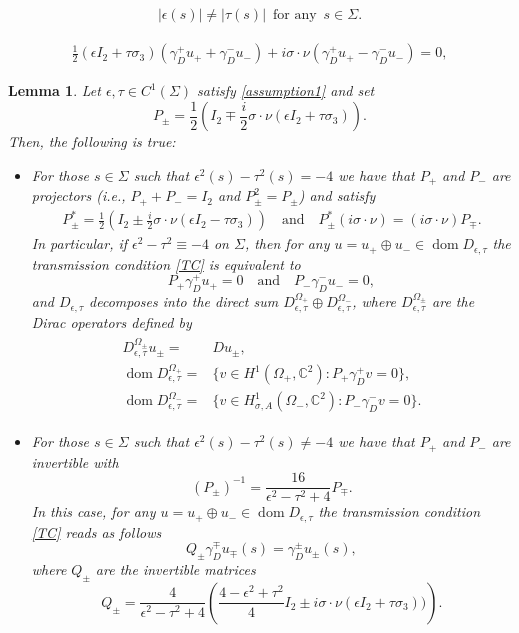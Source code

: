 \documentclass[10pt,a4paper]{amsart}
\newtheorem{lemma}{Lemma}
\def \cc {{\mathbb C}}
\DeclareMathOperator{\dom}{dom}
\begin{document}
     \begin{align}\label{assumption1}
     |\epsilon(s)|\neq |\tau(s)|\,\,\, \text{for any }\, s\in\Sigma.
     \end{align}

\begin{align}\label{TC}
    \frac{1}{2}(\epsilon I_2+\tau\sigma_3)(\gamma_D^+u_+ +\gamma_D^-u_-) +i\sigma\cdot\nu(\gamma_D^+u_+-\gamma_D^-u_-)=0,
 \end{align}

\begin{lemma}\label{TC_alter} Let $\epsilon,\tau\in C^1(\Sigma)$ satisfy \eqref{assumption1} and set 
\begin{equation*}\label{Projection}
    P_\pm=\frac{1}{2}\left(I_2 \mp \frac{i}{2}\sigma\cdot\nu(\epsilon I_2+\tau\sigma_3) \right).
\end{equation*}
Then, the following is true:  
\begin{itemize}
    \item[(i)] For those $s\in\Sigma$ such that   $\epsilon^2(s)-\tau^2(s)=-4$ we have that  $P_+$ and $P_-$ are projectors (i.e., $P_+ +P_-=I_2$ and $P_\pm^2= P_\pm$) and satisfy 
    \begin{align}\label{P_pm}
   P_\pm^\ast=\frac{1}{2}\left(I_2 \pm \frac{i}{2}\sigma\cdot\nu(\epsilon I_2-\tau\sigma_3) \right)\quad\text{and}\quad   P_\pm^\ast(i\sigma\cdot\nu)=(i\sigma\cdot\nu)P_\mp.
    \end{align}
  In particular, if  $\epsilon^2-\tau^2\equiv-4$ on $\Sigma$, then  for any $u=u_+\oplus u_-\in\dom D_{\epsilon,\tau}$ the transmission condition \eqref{TC} is equivalent to
    \[
    P_+ \gamma_D^+u_+=0 \quad\text{and}\quad  P_- \gamma_D^-u_-=0,
    \]
  and $D_{\epsilon,\tau}$ decomposes into the direct sum $D^{\Omega_+}_{\epsilon,\tau}\oplus D^{\Omega_-}_{\epsilon,\tau}$, where $D^{\Omega_\pm}_{\epsilon,\tau}$ are the Dirac operators defined by
    \begin{align}\label{H_Omega}
		\begin{split}
			D^{\Omega_\pm}_{\epsilon,\tau}u_\pm =& D u_\pm , \\
			\dom D^{\Omega_+}_{\epsilon,\tau} =& \{ v \in  H^1(\Omega_+,\cc^2): P_+ \gamma_D^+v=0  \},\\
            \dom D^{\Omega_-}_{\epsilon,\tau} =& \{ v \in H^1_{\sigma, A}(\Omega_-,\cc^2): P_- \gamma_D^-v=0  \}.
		\end{split}
	\end{align}
    \item[(ii)] For those $s\in\Sigma$ such that   $\epsilon^2(s)-\tau^2(s)\neq-4$ we have that   $P_+$ and $P_-$ are invertible with 
    \[
    (P_\pm)^{-1}=\frac{16}{\epsilon^2-\tau^2+4}P_{\mp}.
    \]
    In this case, for any $u=u_+\oplus u_-\in\dom D_{\epsilon,\tau}$ the transmission condition \eqref{TC} reads as follows
    \[
  Q_\pm \gamma_D^\mp u_\mp(s)=  \gamma_D^\pm u_\pm(s),
    \]
    where $Q_\pm$ are the invertible matrices
    \[
    Q_\pm= \frac{4}{\epsilon^2-\tau^2+4}\left(\frac{4 -\epsilon^2+\tau^2}{4}I_2 \pm i\sigma\cdot\nu(\epsilon I_2+\tau\sigma_3)) \right).
    \]
\end{itemize}
\end{lemma}
\end{document}
